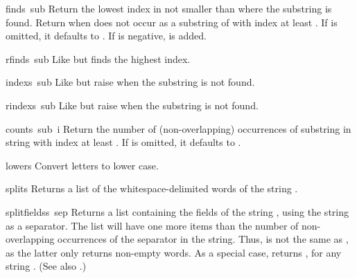 \begin{funcdesc}{find}{s\, sub}
Return the lowest index in  not smaller than  where the
substring  is found.  Return  when 
does not occur as a substring of  with index at least .
If  is omitted, it defaults to .  If  is
negative,  is added.
\end{funcdesc}

\begin{funcdesc}{rfind}{s\, sub}
Like  but finds the highest index.
\end{funcdesc}

\begin{funcdesc}{index}{s\, sub}
Like  but raise  when the substring is
not found.
\end{funcdesc}

\begin{funcdesc}{rindex}{s\, sub}
Like  but raise  when the substring is
not found.
\end{funcdesc}

\begin{funcdesc}{count}{s\, sub\, i}
Return the number of (non-overlapping) occurrences of substring
 in string  with index at least .
If  is omitted, it defaults to .
\end{funcdesc}

\begin{funcdesc}{lower}{s}
Convert letters to lower case.
\end{funcdesc}

\begin{funcdesc}{split}{s}
Returns a list of the whitespace-delimited words of the string
.
\end{funcdesc}

\begin{funcdesc}{splitfields}{s\, sep}
  Returns a list containing the fields of the string , using
  the string  as a separator.  The list will have one more
  items than the number of non-overlapping occurrences of the
  separator in the string.  Thus,  is not the same as , as the latter
  only returns non-empty words.  As a special case,
   returns \code{[\var{s}]}, for any string
  .  (See also .)
\end{funcdesc}

